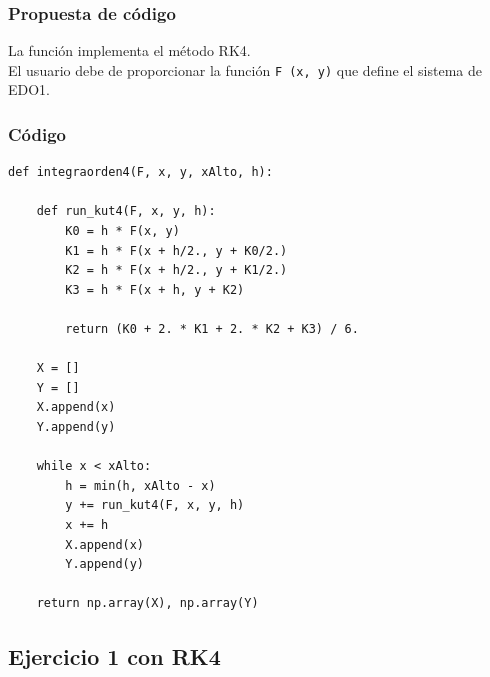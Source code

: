 \documentclass[12pt]{beamer}
\begin{document}
\begin{frame}
\frametitle{Propuesta de código}
La función  implementa el método RK4.
\\
\bigskip
\pause
El usuario debe de proporcionar la función \texttt{F (x, y)} que define el sistema de EDO1.
\end{frame}
\begin{frame}
\frametitle{Código}
\begin{lstlisting}[caption=Código para el método RK4]
def integraorden4(F, x, y, xAlto, h):

    def run_kut4(F, x, y, h):
        K0 = h * F(x, y)
        K1 = h * F(x + h/2., y + K0/2.)
        K2 = h * F(x + h/2., y + K1/2.)
        K3 = h * F(x + h, y + K2)
        
        return (K0 + 2. * K1 + 2. * K2 + K3) / 6.
    
    X = []
    Y = []
    X.append(x)
    Y.append(y)
    
    while x < xAlto:
        h = min(h, xAlto - x)
        y += run_kut4(F, x, y, h)
        x += h
        X.append(x)
        Y.append(y)
    
    return np.array(X), np.array(Y)
\end{lstlisting}
\end{frame}

\subsection{Ejercicio 1 con RK4}
\end{document}
